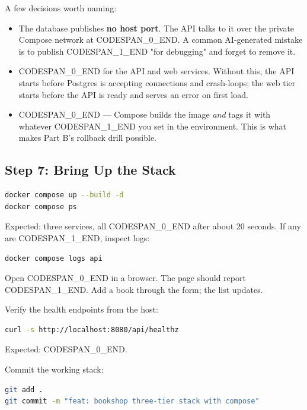 \documentclass[11pt,a4paper]{book}
\begin{document}
A few decisions worth naming:

\begin{itemize}
  \item The database publishes \textbf{no host port}. The API talks to it over the private Compose network at CODESPAN\_0\_END. A common AI-generated mistake is to publish CODESPAN\_1\_END "for debugging" and forget to remove it.
  \item CODESPAN\_0\_END for the API and web services. Without this, the API starts before Postgres is accepting connections and crash-loops; the web tier starts before the API is ready and serves an error on first load.
  \item CODESPAN\_0\_END --- Compose builds the image \textit{and} tags it with whatever CODESPAN\_1\_END you set in the environment. This is what makes Part B's rollback drill possible.
\end{itemize}

\medskip

\subsection{Step 7: Bring Up the Stack}

\begin{lstlisting}[language=Bash]
docker compose up --build -d
docker compose ps
\end{lstlisting}

Expected: three services, all CODESPAN\_0\_END after about 20 seconds. If any are CODESPAN\_1\_END, inspect logs:

\begin{lstlisting}[language=Bash]
docker compose logs api
\end{lstlisting}

Open CODESPAN\_0\_END in a browser. The page should report CODESPAN\_1\_END. Add a book through the form; the list updates.

Verify the health endpoints from the host:

\begin{lstlisting}[language=Bash]
curl -s http://localhost:8080/api/healthz
\end{lstlisting}

Expected: CODESPAN\_0\_END.

Commit the working stack:

\begin{lstlisting}[language=Bash]
git add .
git commit -m "feat: bookshop three-tier stack with compose"
\end{lstlisting}
\end{document}

